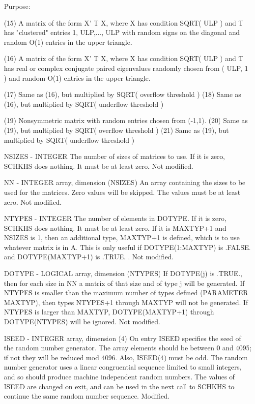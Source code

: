 \begin{DoxyParagraph}{Purpose\+: }
\begin{DoxyVerb}
    (15) A matrix of the form  X' T X, where X has condition
         SQRT( ULP ) and T has "clustered" entries 1, ULP,..., ULP
         with random signs on the diagonal and random O(1) entries
         in the upper triangle.

    (16) A matrix of the form  X' T X, where X has condition
         SQRT( ULP ) and T has real or complex conjugate paired
         eigenvalues randomly chosen from ( ULP, 1 ) and random
         O(1) entries in the upper triangle.

    (17) Same as (16), but multiplied by SQRT( overflow threshold )
    (18) Same as (16), but multiplied by SQRT( underflow threshold )

    (19) Nonsymmetric matrix with random entries chosen from (-1,1).
    (20) Same as (19), but multiplied by SQRT( overflow threshold )
    (21) Same as (19), but multiplied by SQRT( underflow threshold )\end{DoxyVerb}
 \begin{DoxyVerb}  NSIZES - INTEGER
           The number of sizes of matrices to use.  If it is zero,
           SCHKHS does nothing.  It must be at least zero.
           Not modified.

  NN     - INTEGER array, dimension (NSIZES)
           An array containing the sizes to be used for the matrices.
           Zero values will be skipped.  The values must be at least
           zero.
           Not modified.

  NTYPES - INTEGER
           The number of elements in DOTYPE.   If it is zero, SCHKHS
           does nothing.  It must be at least zero.  If it is MAXTYP+1
           and NSIZES is 1, then an additional type, MAXTYP+1 is
           defined, which is to use whatever matrix is in A.  This
           is only useful if DOTYPE(1:MAXTYP) is .FALSE. and
           DOTYPE(MAXTYP+1) is .TRUE. .
           Not modified.

  DOTYPE - LOGICAL array, dimension (NTYPES)
           If DOTYPE(j) is .TRUE., then for each size in NN a
           matrix of that size and of type j will be generated.
           If NTYPES is smaller than the maximum number of types
           defined (PARAMETER MAXTYP), then types NTYPES+1 through
           MAXTYP will not be generated.  If NTYPES is larger
           than MAXTYP, DOTYPE(MAXTYP+1) through DOTYPE(NTYPES)
           will be ignored.
           Not modified.

  ISEED  - INTEGER array, dimension (4)
           On entry ISEED specifies the seed of the random number
           generator. The array elements should be between 0 and 4095;
           if not they will be reduced mod 4096.  Also, ISEED(4) must
           be odd.  The random number generator uses a linear
           congruential sequence limited to small integers, and so
           should produce machine independent random numbers. The
           values of ISEED are changed on exit, and can be used in the
           next call to SCHKHS to continue the same random number
           sequence.
           Modified.


\end{DoxyVerb}
\end{DoxyParagraph}
